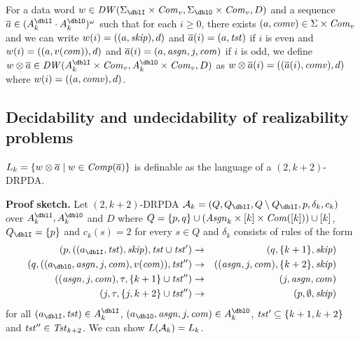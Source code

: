 For a data word
$w\in\DW(\Sigma_\dblI\times\Com_v,\Sigma_\dblO\times\Com_v,D)$ and
a sequence $\overa\in(A_k^\dblI\cdot A_k^\dblO)^\omega$
such that
for each $i\geq 0$, there exists
$(a,\mathit{comv})\in\Sigma\times \mathit{Com}_v$
and we can write
$w(i)=((a,\mathit{skip}),d)$ and ${\overline{a}}(i)=(a,\mathit{tst})$ if $i$ is even
and
$w(i)=((a,v(\mathit{com})),d)$ and ${\overline{a}}(i)=(a,\mathit{asgn},j,\mathit{com})$ if $i$ is odd,
we define $w\otimes\overa\in\DW(A_k^\dblI\times\Com_v,A_k^\dblO\times\Com_v,D)$ as
$w\otimes{\overline{a}}(i)=(({\overline{a}}(i),\mathit{comv}), d)$ where $w(i)=((a,\mathit{comv}),d)$.


\subsection{Decidability and undecidability of realizability problems}
\begin{lemma}\label{lem: Lk}
$L_k = \{w\otimes{\overline{a}} \mid w\in{\mathit{Comp}}({\overline{a}})\}$ is definable as the language of a $(2,k+2)$-DRPDA.
\end{lemma}
{\bf Proof sketch.}\quad
Let $(2,k+2)$-DRPDA
$\calA_k = (Q, Q_\dblI, Q\setminus Q_\dblI, p, \delta_k, c_k)$ over $A_k^\dblI, A_k^\dblO$ and $D$ where
$Q=\{p, q\}\cup(\mathit{Asgn}_k\times[k]\times\mathit{Com}([k]))\cup[k]$, $Q_\dblI=\{p\}$
and $c_k(s)=2$ for every $s\in Q$ and $\delta_k$ consists of rules of the form
\begin{eqnarray}
(p, ((a_\dblI, \tst), \skip), \tst\cup\tst') &\to& (q, \{k+1\}, \skip)\label{eq: Lk1}\\
(q, ((a_\dblO, \asgn, j, \com), v(\com)), \tst'')&\to& ((\asgn,j,\com), \{k+2\},\skip)\label{eq: Lk2}\\
((\asgn,j,\com), \tau, \{k+1\}\cup\tst'')&\to& (j, \asgn, \com)\label{eq: Lk3}\\
(j, \tau, \{j, k+2\}\cup\tst'')&\to& (p, \emptyset, \skip)\label{eq: Lk4}
\end{eqnarray}
for all $(a_\dblI, \tst)\in A_k^\dblI$, $(a_\dblO, \asgn, j, \com)\in A_k^\dblO$, $\mathit{tst}'\subseteq \{k+1,k+2\}$ and $\mathit{tst}''\in\mathit{Tst}_{k+2}$.
We can show $L({\cal A}_k)=L_k$.


